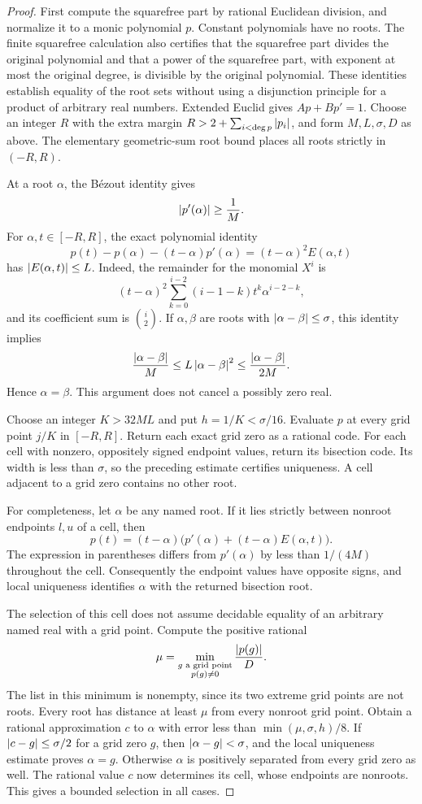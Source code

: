 \begin{proof}
First compute the squarefree part by rational Euclidean division, and
normalize it to a monic polynomial $p$. Constant polynomials have no roots.
The finite squarefree calculation also certifies that the squarefree part
divides the original polynomial and that a power of the squarefree part,
with exponent at most the original degree, is divisible by the original
polynomial. These identities establish equality of the root sets without
using a disjunction principle for a product of arbitrary real numbers.
Extended Euclid gives $Ap+Bp'=1$. Choose an integer $R$ with the extra margin
$R>2+\sum_{i<\deg p}\left|p_i\right|$, and form $M,L,\sigma,D$ as above.
The elementary geometric-sum root bound places all roots strictly in
$(-R,R)$.

At a root $\alpha$, the B\'ezout identity gives
\[
 \left|p'(\alpha)\right|\ge\frac1M.
\]
For $\alpha,t\in[-R,R]$, the exact polynomial identity
\[
 p(t)-p(\alpha)-(t-\alpha)p'(\alpha)
       =(t-\alpha)^2 E(\alpha,t)
\]
has $\left|E(\alpha,t)\right|\le L$. Indeed, the remainder for the monomial $X^i$
is
\[
 (t-\alpha)^2
 \sum_{k=0}^{i-2}(i-1-k)t^k\alpha^{i-2-k},
\]
and its coefficient sum is $\binom i2$.
If $\alpha,\beta$ are roots with $\left|\alpha-\beta\right|\le\sigma$, this identity
implies
\[
 \frac{\left|\alpha-\beta\right|}M
 \le L\left|\alpha-\beta\right|^2
 \le \frac{\left|\alpha-\beta\right|}{2M}.
\]
Hence $\alpha=\beta$. This argument does not cancel a possibly zero real.

Choose an integer $K>32ML$ and put $h=1/K<\sigma/16$.
Evaluate $p$ at every grid point $j/K$ in $[-R,R]$.
Return each exact grid zero as a rational code. For each cell with nonzero,
oppositely signed endpoint values, return its bisection code.
Its width is less than $\sigma$, so the preceding estimate certifies
uniqueness. A cell adjacent to a grid zero contains no other root.

For completeness, let $\alpha$ be any named root. If it lies strictly
between nonroot endpoints $l,u$ of a cell, then
\[
 p(t)=(t-\alpha)
       \bigl(p'(\alpha)+(t-\alpha)E(\alpha,t)\bigr).
\]
The expression in parentheses differs from $p'(\alpha)$ by less than
$1/(4M)$ throughout the cell. Consequently the endpoint values have
opposite signs, and local uniqueness identifies $\alpha$ with the
returned bisection root.

The selection of this cell does not assume decidable equality of an
arbitrary named real with a grid point. Compute the positive rational
\[
 \mu=\min_{\substack{g\text{ a grid point}\\p(g)\ne0}}
                         \frac{\left|p(g)\right|}D.
\]
The list in this minimum is nonempty, since its two extreme grid points
are not roots. Every root has distance at least $\mu$ from every nonroot
grid point. Obtain a rational approximation $c$ to $\alpha$ with error
less than $\min(\mu,\sigma,h)/8$.
If $\left|c-g\right|\le\sigma/2$ for a grid zero $g$, then
$\left|\alpha-g\right|<\sigma$, and the local uniqueness estimate proves
$\alpha=g$. Otherwise $\alpha$ is positively separated from every grid
zero as well. The rational value $c$ now determines its cell, whose
endpoints are nonroots. This gives a bounded selection in all cases.


\end{proof}
